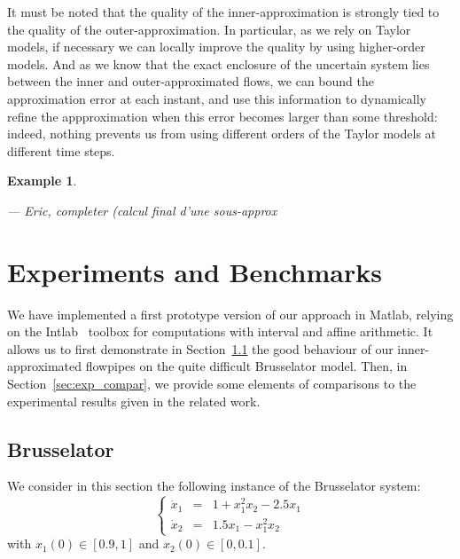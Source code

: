\documentclass{sig-alternate-05-2015} %
\newcommand\ForAuthors[1]%
 {\par\smallskip                     %
  \begin{center}%
   \fbox%
   {\parbox{0.9\linewidth}%
    {\raggedright\sc--- #1}%
   }%
  \end{center}%
  \par\smallskip                     %
 }
\newtheorem{example}{Example}
\begin{document}
It must be noted that the quality of the inner-approximation is strongly tied to the quality of the outer-approximation. 
In particular, as we rely on Taylor models, if necessary we can locally improve the quality by using higher-order models. 
And as we know that the exact enclosure of the uncertain system lies between the inner and outer-approximated flows, 
we can bound the approximation error at each instant, and use this information to dynamically refine the appproximation 
when this error becomes larger than some threshold: indeed, nothing prevents us from using different orders of the Taylor models 
at different time steps.  

\begin{example}

\ForAuthors{Eric, completer (calcul final d'une sous-approx}
\end{example}

\section{Experiments and Benchmarks}
\label{sec:experiments}
We have implemented a first prototype version of our approach in Matlab, relying on the Intlab~\cite{Ru99a} 
toolbox for computations with interval and affine arithmetic.
It allows us to first demonstrate in Section~\ref{sec:exp_bruss} the good behaviour of our inner-approximated flowpipes
 on the quite difficult Brusselator model. %
Then, in Section~\ref{sec:exp_compar}, we provide some elements of comparisons to the experimental results 
given in the related work. 
 
\subsection{Brusselator}
\label{sec:exp_bruss}

We consider in this section the following instance of the Brusselator system: 
$$\left\{\begin{array}{rcl}
\dot{x}_1 & = & 1+x_1^2x_2-2.5x_1 \\
\dot{x}_2 & = & 1.5x_1-x_1^2x_2
\end{array}\right.$$
\noindent with $x_1(0) \in [0.9,1]$ and $x_2(0) \in [0,0.1]$.
\end{document}

